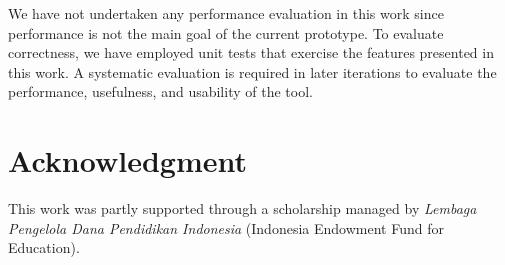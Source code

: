 \documentclass[conference]{IEEEtran}
\begin{document}
We have not undertaken any performance evaluation in this work 
since performance is not the main goal of the current prototype.
To evaluate correctness, we have employed unit tests that exercise the features 
presented in this work. A systematic evaluation is required in later iterations 
to evaluate the performance, usefulness, and usability of the tool.


\section*{Acknowledgment}
This work was partly supported through a scholarship managed by \emph{Lembaga Pengelola Dana Pendidikan Indonesia} (Indonesia Endowment Fund for Education).



\end{document}
